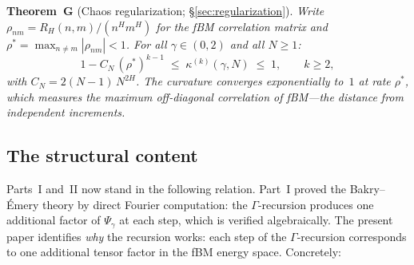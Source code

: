\documentclass[11pt,a4paper]{article}
\theoremstyle{plain}
\theoremstyle{definition}
\theoremstyle{remark}
\begin{document}
\medskip\noindent
\textbf{Theorem~G} (Chaos regularization;
\S\ref{sec:regularization}).
\emph{Write $\rho_{nm} = R_H(n,m)/(n^H m^H)$ for the
fBM correlation matrix and
$\rho^* = \max_{n \neq m}|\rho_{nm}| < 1$.
For all $\gamma \in (0,2)$ and all $N \geq 1$:
\begin{equation}\label{eq:intro-G}
  1 - C_N\,(\rho^*)^{k-1}
  \;\leq\; \kappa^{(k)}(\gamma,N)
  \;\leq\; 1,
  \qquad k \geq 2,
\end{equation}
with $C_N = 2(N{-}1)\,N^{2H}$.
The curvature converges exponentially to~$1$ at rate
$\rho^*$, which measures the maximum off-diagonal
correlation of fBM---the distance from independent
increments.}


\subsection{The structural content}

Parts~I and~II now stand in the following relation.
Part~I proved the Bakry--\'Emery theory by direct
Fourier computation: the $\Gamma$-recursion produces
one additional factor of $\Psi_\gamma$ at each step,
which is verified algebraically.  The present paper
identifies \emph{why} the recursion works: each step
of the $\Gamma$-recursion corresponds to one additional
tensor factor in the fBM energy space.  Concretely:
\end{document}
